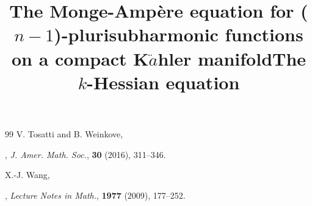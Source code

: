 \documentclass[a4paper,11pt]{amsart}
\theoremstyle{plain}
\theoremstyle{remark}
\numberwithin{equation}{section}
\numberwithin{figure}{section}
\numberwithin{remark}{section}
\begin{document}
\begin{sloppypar}
\begin{thebibliography}{99}
\newblock V. Tosatti and  B. Weinkove,
\newblock \title{The Monge-Amp\`ere equation for ($n-1$)-plurisubharmonic functions on a compact K$\ddot{a}$hler manifold},
\newblock \emph{J. Amer. Math. Soc.}, \textbf{30} (2016), 311--346.

\newblock X.-J. Wang,
\newblock \title{The  $k$-Hessian equation},
\newblock \emph{Lecture Notes in Math.}, \textbf{1977} (2009), 177--252.





\end{thebibliography}

\end{sloppypar}
\end{document}

